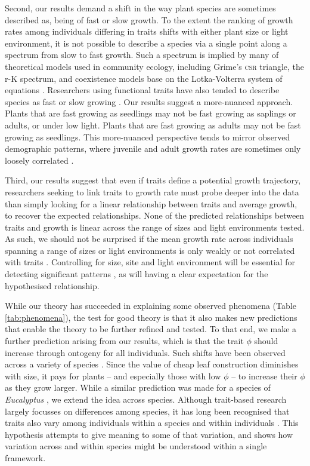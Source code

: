 \documentclass[9pt,twocolumn,twoside]{pnas-new}
\begin{document}
Second, our results demand a shift in the way plant species are sometimes described as, being of fast or slow growth. To the extent the ranking of growth rates among individuals differing in traits shifts with either plant size or light environment, it is not possible to describe a species via a single point along a spectrum from slow to fast growth. Such a spectrum is implied by many of theoretical models used in community ecology, including Grime's \textsc{csr} triangle, the r-K spectrum, and coexistence models base on the Lotka-Volterra system of equations \citep[e.g.][]{Grime-1977,Chesson-2000}. Researchers using functional traits have also tended to describe species as fast or slow growing \citep[e.g.][]{Adler-2014, Diaz-2016}. Our results suggest a more-nuanced approach. Plants that are fast growing as seedlings may not be fast growing as saplings or adults, or under low light. Plants that are fast growing as adults may not be fast growing as seedlings. This more-nuanced perspective tends to mirror observed demographic patterns, where juvenile and adult growth rates are sometimes only loosely correlated \citep{Rees-2001}.

Third, our results suggest that even if traits define a potential growth trajectory, researchers seeking to link traits to growth rate must probe deeper into the data than simply looking for a linear relationship between traits and average growth, to recover the expected relationships. None of the predicted relationships between traits and growth is linear across the range of sizes and light environments tested. As such, we should not be surprised if the mean growth rate across individuals spanning a range of sizes or light environments is only weakly or not correlated with traits \citep[e.g.][]{Poorter-2008,Paine-2015}. Controlling for size, site and light environment will be essential for detecting significant patterns \citep[e.g.][]{Gibert-2016}, as will having a clear expectation for the hypothesised relationship.

While our theory has succeeded in explaining some observed phenomena (Table \ref{tab:phenomena}), the test for good theory is that it also makes new predictions that enable the theory to be further refined and tested. To that end, we make a further prediction arising from our results, which is that the trait $\phi$ should increase through ontogeny for all individuals. Such shifts have been observed across a variety of species \citep{King-1999,Thomas-1999,Koch-2004}. Since the value of cheap leaf construction diminishes with size, it pays for plants -- and especially those with low $\phi$ -- to increase their $\phi$ as they grow larger. While a similar prediction was made for a species of \emph{Eucalyptus} \citep{King-1999}, we extend the idea across species. Although trait-based research largely focusses on differences among species, it has long been recognised that traits also vary among individuals within a species and within individuals \citep{Westoby-2002}. This hypothesis attempts to give meaning to some of that variation, and shows how variation across and within species might be understood within a single framework.
\end{document}
